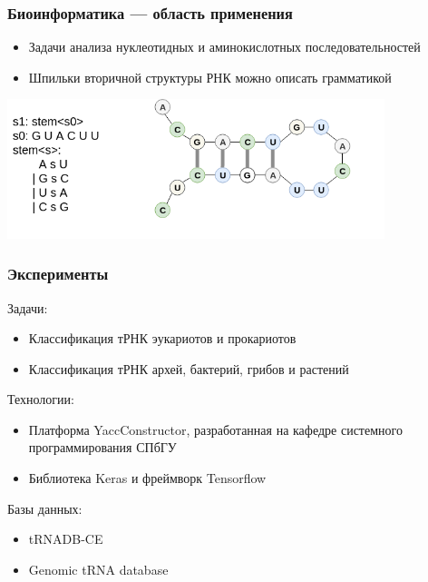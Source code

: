 \documentclass{beamer}
\begin{document}
\begin{frame}\frametitle{Биоинформатика --- область применения}
\begin{itemize}
    \item Задачи анализа нуклеотидных и аминокислотных последовательностей
    \item Шпильки вторичной структуры РНК можно описать грамматикой
\end{itemize} 
\vspace{8mm}
\hspace*{6mm}
\includegraphics[width=11cm]{pics/rna_gram.png}
\end{frame}

\begin{frame}\frametitle{Эксперименты}
Задачи:
\begin{itemize}
    \item Классификация тРНК эукариотов и прокариотов
    \item Классификация тРНК архей, бактерий, грибов и растений
\end{itemize}
\vspace{6mm}
Технологии:
\begin{itemize}
    \item Платформа YaccConstructor, разработанная на кафедре системного программирования СПбГУ
    \item Библиотека Keras и фреймворк Tensorflow
\end{itemize}
\vspace{6mm}
Базы данных:
\begin{itemize}
    \item tRNADB-CE
    \item Genomic tRNA database
\end{itemize}
\end{frame}
\end{document}
